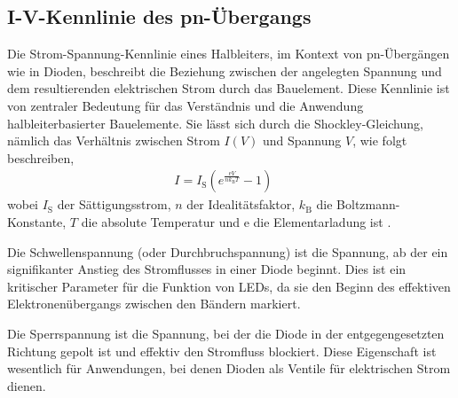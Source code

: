 \subsection{I-V-Kennlinie des pn-Übergangs}
Die Strom-Spannung-Kennlinie eines Halbleiters, im Kontext von pn-Übergängen wie in Dioden, beschreibt die Beziehung zwischen der angelegten Spannung und dem resultierenden elektrischen Strom durch das Bauelement. Diese Kennlinie ist von zentraler Bedeutung für das Verständnis und die Anwendung halbleiterbasierter Bauelemente.
Sie lässt sich durch die Shockley-Gleichung, nämlich das Verhältnis zwischen Strom $I(V)$ und Spannung $V$, wie folgt beschreiben,
\begin{align}
    \label{eq:IV}
    I = I_\mathrm{S} \left( e^{\frac{\mathrm{e}V}{nk_\mathrm{B}T}} - 1 \right) \quad \, 
\end{align}
wobei $I_\mathrm{S}$ der Sättigungsstrom, $n$ der Idealitätsfaktor, $k_\mathrm{B}$ die Boltzmann-Konstante, $T$ die absolute Temperatur und $\mathrm{e}$ die Elementarladung ist \cite{SkriptF13}.


Die Schwellenspannung (oder Durchbruchspannung) ist die Spannung, ab der ein signifikanter Anstieg des Stromflusses in einer Diode beginnt. Dies ist ein kritischer Parameter für die Funktion von LEDs, da sie den Beginn des effektiven Elektronenübergangs zwischen den Bändern markiert.

Die Sperrspannung ist die Spannung, bei der die Diode in der entgegengesetzten Richtung gepolt ist und effektiv den Stromfluss blockiert. Diese Eigenschaft ist wesentlich für Anwendungen, bei denen Dioden als Ventile für elektrischen Strom dienen.





